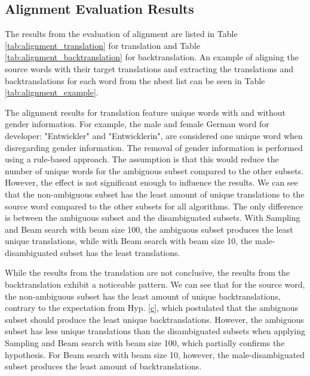 \clearpage

\subsection{Alignment Evaluation Results}
\label{ch:Base_Experiment:Results:Alignment}

The results from the evaluation of alignment are listed in Table \ref{tab:alignment_translation} for translation and Table \ref{tab:alignment_backtranslation} for backtranslation. An example of aligning the source words with their target translations and extracting the translations and backtranslations for each word from the nbest list can be seen in Table \ref{tab:alignment_example}.


The alignment results for translation feature unique words with and without gender information. For example, the male and female German word for developer: "Entwickler" and "Entwicklerin", are considered one unique word when disregarding gender information. The removal of gender information is performed using a rule-based approach. The assumption is that this would reduce the number of unique words for the ambiguous subset compared to the other subsets. However, the effect is not significant enough to influence the results. We can see that the non-ambiguous subset has the least amount of unique translations to the source word compared to the other subsets for all algorithms. The only difference is between the ambiguous subset and the disambiguated subsets. With Sampling and Beam search with beam size 100, the ambiguous subset produces the least unique translations, while with Beam search with beam size 10, the male-disambiguated subset has the least translations.

While the results from the translation are not conclusive, the results from the backtranslation exhibit a noticeable pattern. We can see that for the source word, the non-ambiguous subset has the least amount of unique backtranslations, contrary to the expectation from Hyp. \ref{c}, which postulated that the ambiguous subset should produce the least unique backtranslations. However, the ambiguous subset has less unique translations than the disambiguated subsets when applying Sampling and Beam search with beam size 100, which partially confirms the hypothesis. For Beam search with beam size 10, however, the male-disambiguated subset produces the least amount of backtranslations.

